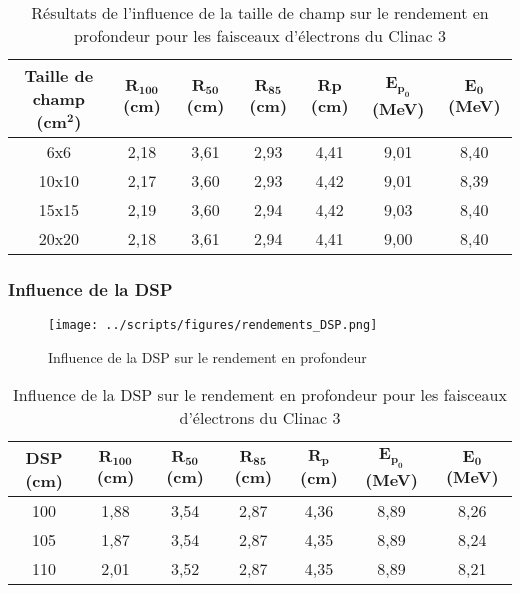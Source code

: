 \documentclass{article}
\begin{document}
\begin{table}[h]
  \centering
  \begin{tabular}{ccccccc}
  \toprule
  \textbf{Taille de champ} \textbf{(cm}$\mathbf{^2}$\textbf{)} & $\mathbf{R_{100}}$ \textbf{(cm)} & $\mathbf{R_{50}}$ \textbf{(cm)} & $\mathbf{R_{85}}$ \textbf{(cm)} & $\mathbf{Rp}$\textbf{(cm)} & $\mathbf{E_{p_0}}$ \textbf{(MeV)} & $\mathbf{E_0}$ \textbf{(MeV)} \\ \toprule
  6x6 & 2,18 & 3,61 & 2,93 & 4,41 & 9,01 & 8,40 \\
  10x10 & 2,17 & 3,60 & 2,93 & 4,42 & 9,01 & 8,39 \\
  15x15 & 2,19 & 3,60 & 2,94 & 4,42 & 9,03 & 8,40 \\
  20x20 & 2,18 & 3,61 & 2,94 & 4,41 & 9,00 & 8,40 \\ \bottomrule
  \end{tabular}
  \caption{Résultats de l'influence de la taille de champ sur le rendement en profondeur pour les faisceaux d'électrons du Clinac 3}
  \label{table_rdt_champs}
\end{table}

\subsubsection{Influence de la DSP}

\begin{figure}[h!]
  \centering
  \texttt{[image: ../scripts/figures/rendements\_DSP.png]}
  \caption{Influence de la DSP sur le rendement en profondeur}
  \label{fig_rdt_DSP}
\end{figure}

\begin{table}[h]
  \centering
  \begin{tabular}{ccccccc}
    \toprule
    \textbf{DSP (cm)} & $\mathbf{R_{100}}$ \textbf{(cm)} & $\mathbf{R_{50}}$ \textbf{(cm)} & $\mathbf{R_{85}}$ \textbf{(cm)} & $\mathbf{R_p}$\textbf{(cm)} & $\mathbf{E_{p_0}}$ \textbf{(MeV)} & $\mathbf{E_0}$ \textbf{(MeV)} \\ \toprule
    100 & 1,88 & 3,54 & 2,87 & 4,36 & 8,89 & 8,26 \\
    105 & 1,87 & 3,54 & 2,87 & 4,35 & 8,89 & 8,24 \\
    110 & 2,01 & 3,52 & 2,87 & 4,35 & 8,89 & 8,21 \\ \bottomrule
  \end{tabular}
  \caption{Influence de la DSP sur le rendement en profondeur pour les faisceaux d'électrons du Clinac 3}
  \label{table_rdt_dsp}
\end{table}
\end{document}
